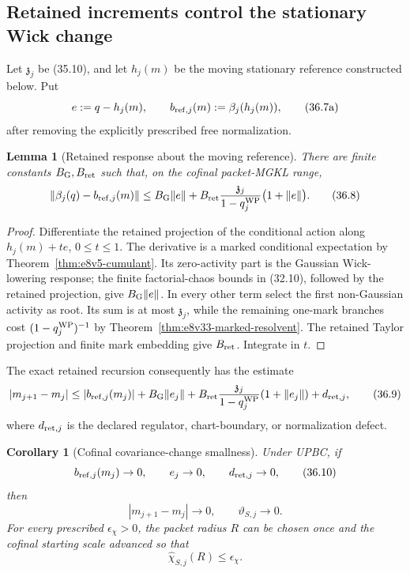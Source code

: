 \documentclass[11pt,oneside]{book}
\newtheorem{lemma}[theorem]{Lemma}
\newtheorem{corollary}[theorem]{Corollary}
\theoremstyle{definition}
\theoremstyle{remark}
\begin{document}
\subsection{Retained increments control the stationary Wick change}

Let \({\mathfrak z}_j\) be (35.10), and let \(h_j(m)\) be the moving
stationary reference constructed below.  Put
\[
 e:=q-h_j(m),\qquad
 b_{{\rm ref},j}(m):=\beta_j(h_j(m)),                           \tag{36.7a}
\]
after removing the explicitly prescribed free normalization.

\begin{lemma}[Retained response about the moving reference]
\label{lem:e8v36-retained-response}
There are finite constants \(B_{\rm G},B_{\rm ret}\) such that, on
the cofinal packet-MGKL range,
\[
 \|\beta_j(q)-b_{{\rm ref},j}(m)\|
 \leq
 B_{\rm G}\|e\|
 +B_{\rm ret}
 \frac{{\mathfrak z}_j}{1-q_j^{\rm WP}}
 \bigl(1+\|e\|\bigr).                                             \tag{36.8}
\]
\end{lemma}

\begin{proof}
Differentiate the retained projection of the conditional action
along \(h_j(m)+te\), \(0\leq t\leq1\).  The derivative is a marked
conditional expectation by
Theorem~\ref{thm:e8v5-cumulant}.  Its zero-activity part is the
Gaussian Wick-lowering response; the finite factorial-chaos bounds
in (32.10), followed by the retained projection, give
\(B_{\rm G}\|e\|\).  In every other term select the first
non-Gaussian activity as root.  Its sum is at most
\({\mathfrak z}_j\), while the remaining one-mark branches cost
\((1-q_j^{\rm WP})^{-1}\) by
Theorem~\ref{thm:e8v33-marked-resolvent}.  The retained Taylor
projection and finite mark embedding give \(B_{\rm ret}\).
Integrate in \(t\).
\end{proof}

The exact retained recursion consequently has the estimate
\[
 |m_{j+1}-m_j|
 \leq
 |b_{{\rm ref},j}(m_j)|
 +B_{\rm G}\|e_j\|
 +B_{\rm ret}
 \frac{{\mathfrak z}_j}{1-q_j^{\rm WP}}
 (1+\|e_j\|)+d_{{\rm ret},j},                                   \tag{36.9}
\]
where \(d_{{\rm ret},j}\) is the declared regulator, chart-boundary,
or normalization defect.

\begin{corollary}[Cofinal covariance-change smallness]
\label{cor:e8v36-covariance-change}
Under UPBC, if
\[
 b_{{\rm ref},j}(m_j)\to0,\qquad
 e_j\to0,\qquad
 d_{{\rm ret},j}\to0,                                           \tag{36.10}
\]
then
\[
 |m_{j+1}-m_j|\to0,\qquad
 \vartheta_{S,j}\to0.                                            \tag{36.11}
\]
For every prescribed \(\epsilon_\chi>0\), the packet radius \(R\)
can be chosen once and the cofinal starting scale advanced so that
\[
                         \widehat\chi_{S,j}(R)\leq\epsilon_\chi.  \tag{36.12}
\]
\end{corollary}
\end{document}
